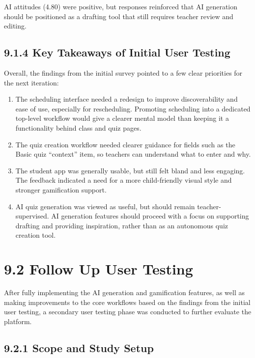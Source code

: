 \documentclass[
  12pt,
  a4paper,
]{report}
\begin{document}
AI attitudes (4.80) were positive, but responses reinforced that AI
generation should be positioned as a drafting tool that still requires
teacher review and editing.

\hypertarget{key-takeaways-initial-user-testing}{%
\subsection{9.1.4 Key Takeaways of Initial User Testing}\label{key-takeaways-initial-user-testing}}

Overall, the findings from the initial survey pointed to a few clear
priorities for the next iteration:

\begin{enumerate}
\def\labelenumi{\arabic{enumi}.}
\item
  The scheduling interface needed a redesign to improve discoverability
  and ease of use, especially for rescheduling. Promoting scheduling into
  a dedicated top-level workflow would give a clearer mental model than
  keeping it a functionality behind class and quiz pages.
\item
  The quiz creation workflow needed clearer guidance for fields such as
  the Basic quiz ``context'' item, so teachers can understand what to
  enter and why.
\item
  The student app was generally usable, but still felt bland and less
  engaging. The feedback indicated a need for a more child-friendly visual style
  and stronger gamification support.
\item
  AI quiz generation was viewed as useful, but should remain
  teacher-supervised. AI generation features should proceed with
  a focus on supporting drafting and providing inspiration, rather
  than as an autonomous quiz creation tool.
\end{enumerate}



\hypertarget{follow-up-user-testing}{%
\section{9.2 Follow Up User Testing}\label{follow-up-user-testing}}

After fully implementing the AI generation and gamification features, as
well as making improvements to the core workflows based on the findings
from the initial user testing, a secondary user testing phase was
conducted to further evaluate the platform.

\hypertarget{study-purpose-and-evaluation-scope-1}{%
\subsection{9.2.1 Scope and Study
Setup}\label{study-purpose-and-evaluation-scope-1}}
\end{document}
